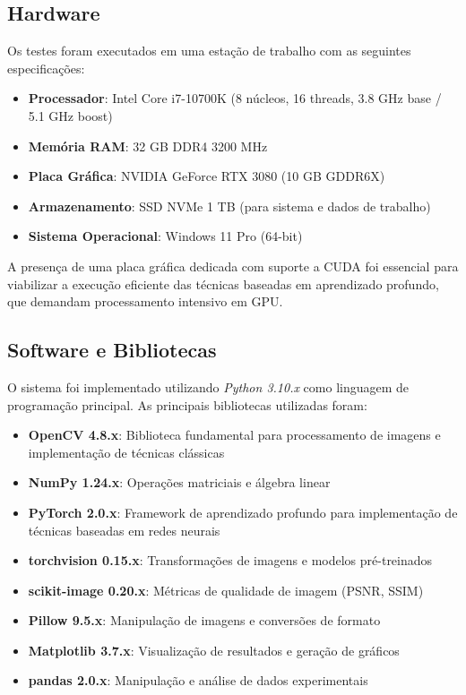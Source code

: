 \subsection{Hardware}

Os testes foram executados em uma estação de trabalho com as seguintes especificações:

\begin{itemize}
    \item \textbf{Processador}: Intel Core i7-10700K (8 núcleos, 16 threads, 3.8 GHz base / 5.1 GHz boost)
    \item \textbf{Memória RAM}: 32 GB DDR4 3200 MHz
    \item \textbf{Placa Gráfica}: NVIDIA GeForce RTX 3080 (10 GB GDDR6X)
    \item \textbf{Armazenamento}: SSD NVMe 1 TB (para sistema e dados de trabalho)
    \item \textbf{Sistema Operacional}: Windows 11 Pro (64-bit)
\end{itemize}

A presença de uma placa gráfica dedicada com suporte a CUDA foi essencial para viabilizar a execução eficiente das técnicas baseadas em aprendizado profundo, que demandam processamento intensivo em GPU.

\subsection{Software e Bibliotecas}

O sistema foi implementado utilizando \textit{Python 3.10.x} como linguagem de programação principal. As principais bibliotecas utilizadas foram:

\begin{itemize}
    \item \textbf{OpenCV 4.8.x}: Biblioteca fundamental para processamento de imagens e implementação de técnicas clássicas
    \item \textbf{NumPy 1.24.x}: Operações matriciais e álgebra linear
    \item \textbf{PyTorch 2.0.x}: Framework de aprendizado profundo para implementação de técnicas baseadas em redes neurais
    \item \textbf{torchvision 0.15.x}: Transformações de imagens e modelos pré-treinados
    \item \textbf{scikit-image 0.20.x}: Métricas de qualidade de imagem (PSNR, SSIM)
    \item \textbf{Pillow 9.5.x}: Manipulação de imagens e conversões de formato
    \item \textbf{Matplotlib 3.7.x}: Visualização de resultados e geração de gráficos
    \item \textbf{pandas 2.0.x}: Manipulação e análise de dados experimentais
\end{itemize}

